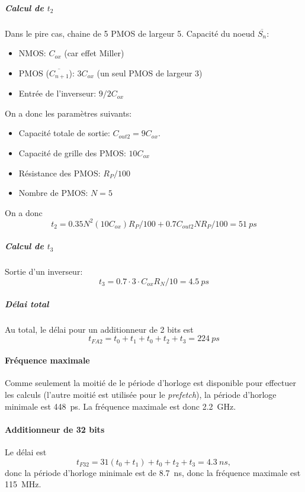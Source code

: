 \documentclass[frenchb,DIV=14]{scrartcl}
\begin{document}
\subparagraph{Calcul de $t_2$}
Dans le pire cas, chaine de 5 PMOS de largeur 5.
Capacité du noeud $\overline{S_n}$:
\begin{itemize}
    \item NMOS: $C_{ox}$ (car effet Miller)
    \item PMOS ($\overline{C_{n+1}}$): $3C_{ox}$ (un seul PMOS de largeur 3)
    \item Entrée de l'inverseur: $9/2 C_{ox}$
\end{itemize}

On a donc les paramètres suivants:
\begin{itemize}
    \item Capacité totale de sortie: $C_{out2} = 9 C_{ox}$.
    \item Capacité de grille des PMOS: $10 C_{ox}$
    \item Résistance des PMOS: $R_P/100$
    \item Nombre de PMOS: $N = 5$
\end{itemize}
On a donc
\[t_2 = 0.35 N^2 (10C_{ox}) R_P/100 + 0.7 C_{out2} N R_P/100 = \SI{51}{ps}\]

\subparagraph{Calcul de $t_3$}
Sortie d'un inverseur:
\[t_3 = 0.7 \cdot 3 \cdot C_{ox} R_N/10 = \SI{4.5}{ps}\]

\subparagraph{Délai total}
Au total, le délai pour un additionneur de 2 bits est
\[t_{FA2} = t_0 + t_1 + t_0 + t_2 + t_3 = \SI{224}{ps}\]

\paragraph{Fréquence maximale}
Comme seulement la moitié de le période d'horloge est disponible pour
effectuer les calculs (l'autre moitié est utilisée pour le \emph{prefetch}),
la période d'horloge minimale est \SI{448}{ps}. La fréquence maximale est
donc \SI{2.2}{GHz}.

\paragraph{Additionneur de 32 bits}
Le délai est
\[t_{F32} = 31 (t_0 + t_1) + t_0 + t_2 + t_3 = \SI{4.3}{ns},\]
donc la période d'horloge minimale est de \SI{8.7}{ns}, donc la
fréquence maximale est \SI{115}{MHz}.
\end{document}
